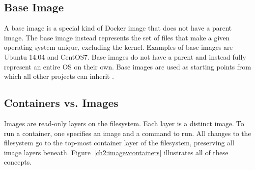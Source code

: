 \subsection{Base Image}
A base image is a special kind of Docker image that does not have a parent image. The base image instead represents the set of files that make a given operating system unique, excluding the kernel. Examples of base images are Ubuntu 14.04 and CentOS7. Base images do not have a parent and instead fully represent an entire OS on their own. Base images are used as starting points from which all other projects can inherit \cite{baseimage}. 

\subsection{Containers vs. Images}
Images are read-only layers on the filesystem. Each layer is a distinct image. To run a container, one specifies an image and a command to run. All changes to the filesystem go to the top-most container layer of the filesystem, preserving all image layers beneath. Figure~\ref{ch2:imagevcontainers} illustrates all of these concepts.

